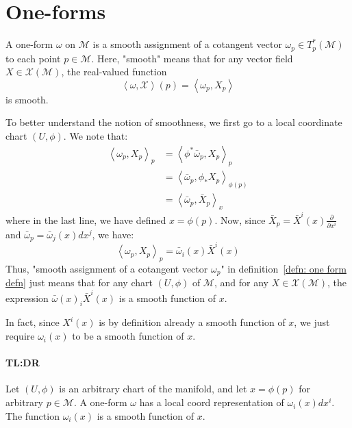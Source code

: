   \section{One-forms}
    \begin{definition}[1-form]
      \label{defn: one form defn}
      A one-form $\omega$ on $\mathcal{M}$ is a smooth assignment of a
      cotangent vector $\omega_p \in T_p^*(\mathcal{M})$ to each point $p \in
      \mathcal{M}$. Here, "smooth" means that for any vector field $X \in \mathcal{X}(\mathcal{M})$, the real-valued function
        \[ \left\langle\omega, \mathcal{X}\right\rangle(p) = \left\langle
        \omega_p, X_p \right\rangle\]
      is smooth.
    \end{definition}
    \begin{remark}
      To better understand the notion of smoothness, we first go to a local
      coordinate chart $(U, \phi)$. We note that:
      \begin{align*}
        \left\langle \omega_p, X_p \right\rangle_p
        &= \left\langle \phi^* \bar{\omega}_p, X_p \right\rangle_p \\
        &= \left\langle  \bar{\omega}_p, \phi_* X_p \right\rangle_{\phi(p)}\\
        &= \left\langle  \bar{\omega}_p, \bar{X}_p \right\rangle_{x}
      \end{align*}
      where in the last line, we have defined $x = \phi(p)$. Now, since
      $\bar{X}_p = \bar{X}^i(x) \frac{\partial}{\partial x^i}$ and
      $\bar{\omega}_p = \bar{\omega}_j(x) dx^j$, we have:
      \begin{equation}
        \label{eqn: one form smoothness defn part 1}
        \left\langle \omega_p, X_p \right\rangle_p = \bar{\omega}_i(x)
        \bar{X}^i(x)
      \end{equation}
      Thus, "smooth assignment of a cotangent vector $\omega_p$" in
      definition~\ref{defn: one form defn} just means that for any chart
      $(U,\phi)$ of $\mathcal{M}$, and for any $X \in
      \mathcal{X}(\mathcal{M})$, the expression $\bar{\omega}(x)_i
      \bar{X}^i(x)$ is a smooth function of $x$.

      In fact, since $X^i(x)$ is by definition already a smooth function of $x$, we just require $\omega_i(x)$ to be a smooth function of $x$.

      \paragraph{TL:DR} Let $(U, \phi)$ is an arbitrary chart of the
      manifold, and let $x = \phi(p)$ for arbitrary $p \in \mathcal{M}$. A
      one-form $\omega$ has a local coord representation of $\omega_i(x)
      dx^i$. The function $\omega_i(x)$ is a smooth function of $x$.

\end{remark}
